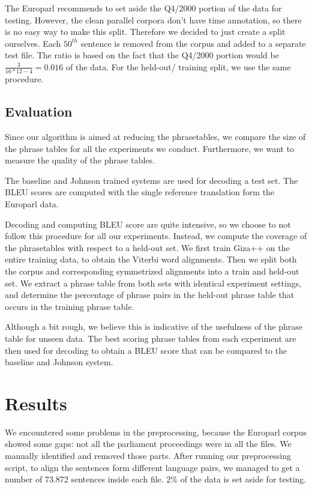 \documentclass[11pt]{article}
\begin{document}
The Europarl recommends to set aside the Q4/2000 portion of the data for testing. However, the clean parallel corpora don't have time annotation, so there is no easy way to make this split. Therefore we decided to just create a split ourselves. Each $50^{th}$ sentence is removed from the corpus and added to a separate test file. The ratio is based on the fact that the Q4/2000 portion would be $\frac{3}{16*12-4}=0.016$ of the data. For the held-out/ training split, we use the same procedure.



\subsection{Evaluation}
Since our algorithm is aimed at reducing the phrasetables, we compare the size of the phrase tables for all the experiments we conduct. Furthermore, we want to measure the quality of the phrase tables.

The baseline and Johnson trained systems are used for decoding a test set. The BLEU scores are computed with the single reference translation form the Europarl data.

Decoding and computing BLEU score are quite intensive, so we choose to not follow this procedure for all our experiments. Instead, we compute the coverage of the phrasetables with respect to a held-out set. We first train Giza++ on the entire training data, to obtain the Viterbi word alignments. Then we split both the corpus and corresponding symmetrized alignments into a train and held-out set. We extract a phrase table from both sets with identical experiment settings, and determine the percentage of phrase pairs in the held-out phrase table that occurs in the training phrase table. 

Although a bit rough, we believe this is indicative of the usefulness of the phrase table for unseen data. The best scoring phrase tables from each experiment are then used for decoding to obtain a BLEU score that can be compared to the baseline and Johnson system. 



\section{Results}

We encountered some problems in the preprocessing, because the Europarl corpus showed some gaps: not all the parliament proceedings were in all the files. We manually identified and removed those parts. After running our preprocessing script, to align the sentences form different language pairs, we managed to get a number of 73.872 sentences inside each file. 2\% of the data is set aside for testing.
\end{document}
